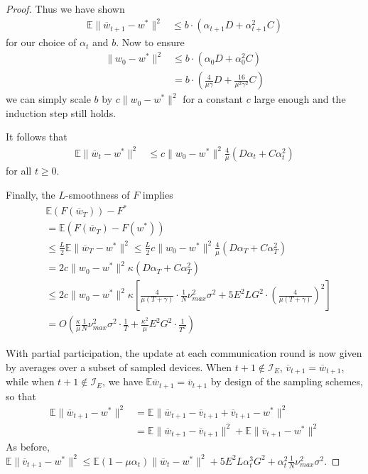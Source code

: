 \begin{proof}
	Thus we have shown 
	\begin{align*}
	\mathbb{E}\|\overline{w}_{t+1}-w^{\ast}\|^{2} & \leq b\cdot(\alpha_{t+1}D+\alpha_{t+1}^{2}C)
	\end{align*}
	for our choice of $\alpha_{t}$ and $b$. Now to ensure 
	\begin{align*}
	\|w_{0}-w^{\ast}\|^{2} & \leq b\cdot(\alpha_{0}D+\alpha_{0}^{2}C)\\
	& =b\cdot(\frac{4}{\mu\gamma}D+\frac{16}{\mu^{2}\gamma^{2}}C)
	\end{align*}
	we can simply scale $b$ by $c\|w_{0}-w^{\ast}\|^{2}$ for a constant
	$c$ large enough and the induction step still holds. 
	
	It follows that 
	\begin{align*}
	\mathbb{E}\|\overline{w}_{t}-w^{\ast}\|^{2} & \leq c\|w_{0}-w^{\ast}\|^{2}\frac{4}{\mu}(D\alpha_{t}+C\alpha_{t}^{2})
	\end{align*}
	for all $t\geq0$. 
	
	Finally, the $L$-smoothness of $F$ implies 
	\begin{align*}
	& \mathbb{E}(F(\overline{w}_{T}))-F^{\ast}\\
	& =\mathbb{E}(F(\overline{w}_{T})-F(w^{\ast}))\\
	& \leq\frac{L}{2}\mathbb{E}\|\overline{w}_{T}-w^{\ast}\|^{2}\leq\frac{L}{2}c\|w_{0}-w^{\ast}\|^{2}\frac{4}{\mu}(D\alpha_{T}+C\alpha_{T}^{2})\\
	& =2c\|w_{0}-w^{\ast}\|^{2}\kappa(D\alpha_{T}+C\alpha_{T}^{2})\\
	& \leq2c\|w_{0}-w^{\ast}\|^{2}\kappa\left[\frac{4}{\mu(T+\gamma)}\cdot\frac{1}{N}\nu_{max}^{2}\sigma^{2}+5E^{2}LG^{2}\cdot(\frac{4}{\mu(T+\gamma)})^{2}\right]\\
	& =O(\frac{\kappa}{\mu}\frac{1}{N}\nu_{max}^{2}\sigma^{2}\cdot\frac{1}{T}+\frac{\kappa^{2}}{\mu}E^{2}G^{2}\cdot\frac{1}{T^{2}})
	\end{align*}
	
	With partial participation, the update at each communication round
	is now given by averages over a subset of sampled devices. When $t+1\notin\mathcal{I}_{E}$,
	$\overline{v}_{t+1}=\overline{w}_{t+1}$, while when $t+1\notin\mathcal{I}_{E}$,
	we have $\mathbb{E}\overline{w}_{t+1}=\overline{v}_{t+1}$ by design
	of the sampling schemes, so that 
	\begin{align*}
	\mathbb{E}\|\overline{w}_{t+1}-w^{\ast}\|^{2} & =\mathbb{E}\|\overline{w}_{t+1}-\overline{v}_{t+1}+\overline{v}_{t+1}-w^{\ast}\|^{2}\\
	& =\mathbb{E}\|\overline{w}_{t+1}-\overline{v}_{t+1}\|^{2}+\mathbb{E}\|\overline{v}_{t+1}-w^{\ast}\|^{2}
	\end{align*}
	As before, $\mathbb{E}\|\overline{v}_{t+1}-w^{\ast}\|^{2}\leq\mathbb{E}(1-\mu\alpha_{t})\|\overline{w}_{t}-w^{\ast}\|^{2}+5E^{2}L\alpha_{t}^{3}G^{2}+\alpha_{t}^{2}\frac{1}{N}\nu_{max}^{2}\sigma^{2}$. 
	

\end{proof}
